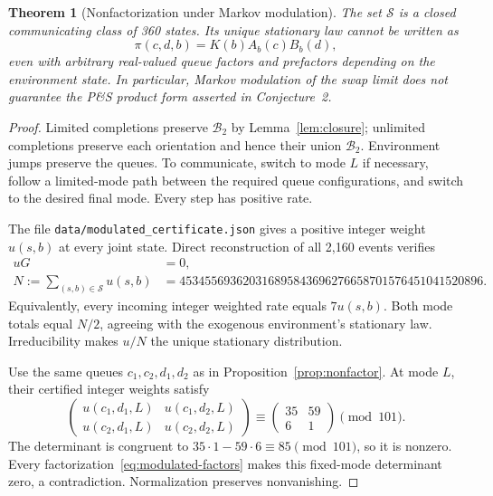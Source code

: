 \documentclass[11pt]{article}
\newtheorem{theorem}{Theorem}
\theoremstyle{remark}
\begin{document}
\begin{theorem}[Nonfactorization under Markov modulation]\label{thm:modulated}
The set $\mathcal S$ is a closed communicating class of 360 states. Its unique stationary law cannot be written as
\begin{equation}\label{eq:modulated-factors}
 \pi(c,d,b)=K(b)A_b(c)B_b(d),
\end{equation}
even with arbitrary real-valued queue factors and prefactors depending on the environment state. In particular, Markov modulation of the swap limit does not guarantee the P\&S product form asserted in Conjecture~2.
\end{theorem}
\begin{proof}
Limited completions preserve $\mathcal B_2$ by Lemma~\ref{lem:closure}; unlimited completions preserve each orientation and hence their union $\mathcal B_2$. Environment jumps preserve the queues. To communicate, switch to mode $L$ if necessary, follow a limited-mode path between the required queue configurations, and switch to the desired final mode. Every step has positive rate.

The file \texttt{data/modulated\_certificate.json} gives a positive integer weight $u(s,b)$ at every joint state. Direct reconstruction of all 2,160 events verifies
\begin{align*}
 uG&=0,\\
 N:=\sum_{(s,b)\in\mathcal S}u(s,b)
   &=453455693620316895843696276658701576451041520896.
\end{align*}
Equivalently, every incoming integer weighted rate equals $7u(s,b)$. Both mode totals equal $N/2$, agreeing with the exogenous environment's stationary law. Irreducibility makes $u/N$ the unique stationary distribution.

Use the same queues $c_1,c_2,d_1,d_2$ as in Proposition~\ref{prop:nonfactor}. At mode $L$, their certified integer weights satisfy
\[
 \begin{pmatrix}
 u(c_1,d_1,L)&u(c_1,d_2,L)\\
 u(c_2,d_1,L)&u(c_2,d_2,L)
 \end{pmatrix}
 \equiv\begin{pmatrix}35&59\\6&1\end{pmatrix}\pmod{101}.
\]
The determinant is congruent to $35\cdot1-59\cdot6\equiv85\pmod{101}$, so it is nonzero. Every factorization~\eqref{eq:modulated-factors} makes this fixed-mode determinant zero, a contradiction. Normalization preserves nonvanishing.
\end{proof}
\end{document}
